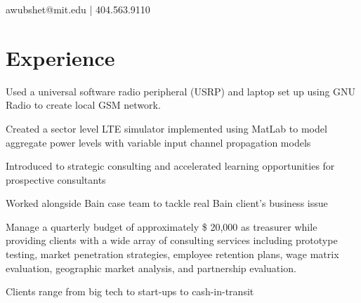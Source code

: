 \documentclass[letterpaper, article]{deedy-resume-openfont}
\begin{document}
%
%


{awubshet@mit.edu | 404.563.9110}

%
%
\hfill

\begin{minipage}[t]{0.66\textwidth}
\vspace{.01cm}
\section{Experience}

\vspace{\topsep} %
\begin{tightemize}
	\item Used a universal software radio peripheral (USRP) and laptop set up using GNU Radio to create local GSM network.
	\item Created a sector level LTE simulator implemented using MatLab to model aggregate power levels with variable input channel propagation models
\end{tightemize}
\sectionsep

\begin{tightemize}
	\item Introduced to strategic consulting and accelerated learning opportunities for prospective consultants
	\item Worked alongside Bain case team to tackle real Bain client's business issue
\end{tightemize}
\sectionsep

\begin{tightemize}
	\item Manage a quarterly budget of approximately \$ 20,000 as treasurer while providing clients with a wide array of consulting services including prototype testing, market penetration strategies, employee retention plans, wage matrix evaluation, geographic market analysis, and partnership evaluation.
	\item Clients range from big tech to start-ups to cash-in-transit
\end{tightemize}
\sectionsep


\end{minipage}
\end{document}
